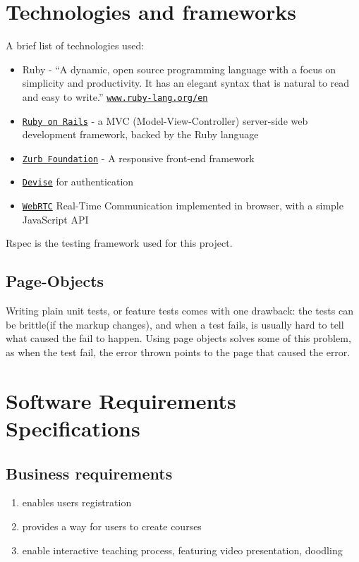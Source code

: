 \section{Technologies and frameworks}
A brief list of technologies used:
\begin{itemize}
    \item Ruby - ``A dynamic, open source programming language with a focus on
        simplicity and productivity.
        It has an elegant syntax that is natural to read and easy to write.''
        \href{https://wwww.ruby-lang.org/en/}{\texttt{www.ruby-lang.org/en}}
    \item \href{http://rubyonrails.org}{\texttt{Ruby on Rails}} - a MVC
        (Model-View-Controller) server-side web development framework, backed by
        the Ruby language
    \item \href{http://foundation.zurb.com/}{\texttt{Zurb Foundation}} - A
        responsive front-end framework
    \item \href{https://github.com/plataformatec/devise}{\texttt{Devise}} for
        authentication
    \item \href{http://www.webrtc.org/}{\texttt{WebRTC}} Real-Time Communication
        implemented in browser, with a simple JavaScript API
\end{itemize}


Rspec is the testing framework used for this project.
\subsection{Page-Objects}
Writing plain unit tests, or feature tests comes with one drawback: the tests
can be brittle(if the markup changes), and when a test fails, is usually hard to
tell what caused the fail to happen. Using page objects solves some of this
problem, as when the test fail, the error thrown points to the page that caused
the error.

\section{Software Requirements Specifications}

\subsection{Business requirements}
\begin{enumerate}
\item enables users registration
\item provides a way for users to create courses
\item enable interactive teaching process, featuring video presentation,
doodling
\end{enumerate}

